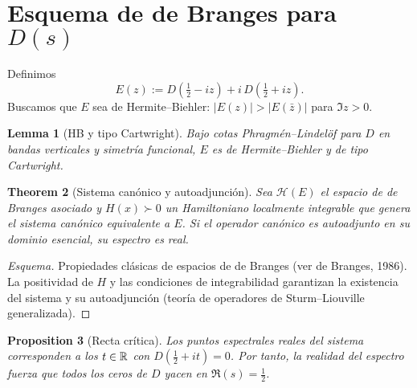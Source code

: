 \section{Esquema de de Branges para $D(s)$}

\newtheorem{theoremC}{Theorem}[section]
\newtheorem{lemmaC}[theoremC]{Lemma}
\newtheorem{propC}[theoremC]{Proposition}

Definimos
\[
E(z):=D\!\left(\tfrac{1}{2}-iz\right)+i\,D\!\left(\tfrac{1}{2}+iz\right).
\]
Buscamos que $E$ sea de Hermite--Biehler: $|E(z)|>|E(\bar z)|$ para $\Im z>0$.

\begin{lemmaC}[HB y tipo Cartwright]
Bajo cotas Phragm\'en--Lindel\"of para $D$ en bandas verticales y simetr\'ia funcional,
$E$ es de Hermite--Biehler y de tipo Cartwright.
\end{lemmaC}

\begin{theoremC}[Sistema can\'onico y autoadjunci\'on]
Sea $\mathcal{H}(E)$ el espacio de de Branges asociado y $H(x)\succ 0$ un Hamiltoniano
localmente integrable que genera el sistema can\'onico equivalente a $E$.
Si el operador can\'onico es autoadjunto en su dominio esencial, su espectro es real.
\end{theoremC}

\begin{proof}[Esquema]
Propiedades cl\'asicas de espacios de de Branges (ver de Branges, 1986).
La positividad de $H$ y las condiciones de integrabilidad garantizan la existencia del
sistema y su autoadjunci\'on (teor\'ia de operadores de Sturm--Liouville generalizada).
\end{proof}

\begin{propC}[Recta cr\'itica]
Los puntos espectrales reales del sistema corresponden a los $t\in\Bbb R$ con
$D(\tfrac{1}{2}+it)=0$. Por tanto, la realidad del espectro fuerza que todos los ceros
de $D$ yacen en $\Re(s)=\tfrac{1}{2}$.
\end{propC}
